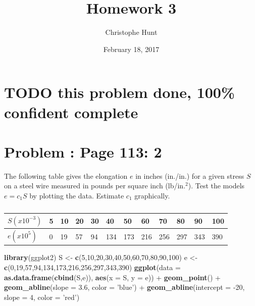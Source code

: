 \documentclass[]{article}
\title{Homework 3}
\author{Christophe Hunt}
\date{February 18, 2017}
\newenvironment{Shaded}{\begin{snugshade}}{\end{snugshade}}
\newcommand{\KeywordTok}[1]{\textcolor[rgb]{0.13,0.29,0.53}{\textbf{{#1}}}}
\newcommand{\DataTypeTok}[1]{\textcolor[rgb]{0.13,0.29,0.53}{{#1}}}
\newcommand{\DecValTok}[1]{\textcolor[rgb]{0.00,0.00,0.81}{{#1}}}
\newcommand{\FloatTok}[1]{\textcolor[rgb]{0.00,0.00,0.81}{{#1}}}
\newcommand{\StringTok}[1]{\textcolor[rgb]{0.31,0.60,0.02}{{#1}}}
\newcommand{\NormalTok}[1]{{#1}}
\begin{document}
\maketitle

{
\setcounter{tocdepth}{2}
\tableofcontents
}
\newpage

\section{TODO this problem done, 100\% confident
complete}\label{todo-this-problem-done-100-confident-complete}

\section{Problem : Page 113: 2}\label{problem-page-113-2}

The following table gives the elongation \(e\) in inches (in./in.) for a
given stress \(S\) on a steel wire measured in pounds per square inch
(lb/in.\(^2\)). Test the models \(e = c_1S\) by plotting the data.
Estimate \(c_1\) graphically.

\begin{table}[!htbp]
\centering
\caption{}
\label{my-label}
\begin{tabular}{l|lllllllllll}
$S(x10^{-3})$ & 5 & 10 & 20 & 30 & 40  & 50  & 60  & 70  & 80  & 90  & 100 \\ \hline
$e(x10^5)$    & 0 & 19 & 57 & 94 & 134 & 173 & 216 & 256 & 297 & 343 & 390 
\end{tabular}
\end{table}

\begin{Shaded}
\begin{Highlighting}[]
\KeywordTok{library}\NormalTok{(ggplot2)}
\NormalTok{S <-}\StringTok{ }\KeywordTok{c}\NormalTok{(}\DecValTok{5}\NormalTok{,}\DecValTok{10}\NormalTok{,}\DecValTok{20}\NormalTok{,}\DecValTok{30}\NormalTok{,}\DecValTok{40}\NormalTok{,}\DecValTok{50}\NormalTok{,}\DecValTok{60}\NormalTok{,}\DecValTok{70}\NormalTok{,}\DecValTok{80}\NormalTok{,}\DecValTok{90}\NormalTok{,}\DecValTok{100}\NormalTok{)}
\NormalTok{e <-}\StringTok{ }\KeywordTok{c}\NormalTok{(}\DecValTok{0}\NormalTok{,}\DecValTok{19}\NormalTok{,}\DecValTok{57}\NormalTok{,}\DecValTok{94}\NormalTok{,}\DecValTok{134}\NormalTok{,}\DecValTok{173}\NormalTok{,}\DecValTok{216}\NormalTok{,}\DecValTok{256}\NormalTok{,}\DecValTok{297}\NormalTok{,}\DecValTok{343}\NormalTok{,}\DecValTok{390}\NormalTok{)}
\KeywordTok{ggplot}\NormalTok{(}\DataTypeTok{data =} \KeywordTok{as.data.frame}\NormalTok{(}\KeywordTok{cbind}\NormalTok{(S,e)), }\KeywordTok{aes}\NormalTok{(}\DataTypeTok{x =} \NormalTok{S, }\DataTypeTok{y =} \NormalTok{e)) +}\StringTok{ }
\StringTok{  }\KeywordTok{geom_point}\NormalTok{() +}
\StringTok{  }\KeywordTok{geom_abline}\NormalTok{(}\DataTypeTok{slope =} \FloatTok{3.6}\NormalTok{, }\DataTypeTok{color =} \StringTok{'blue'}\NormalTok{) +}\StringTok{ }
\StringTok{  }\KeywordTok{geom_abline}\NormalTok{(}\DataTypeTok{intercept =} \NormalTok{-}\DecValTok{20}\NormalTok{, }\DataTypeTok{slope =} \DecValTok{4}\NormalTok{, }\DataTypeTok{color =} \StringTok{'red'}\NormalTok{)}
\end{Highlighting}
\end{Shaded}
\end{document}
